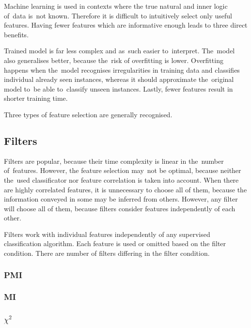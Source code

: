 Machine learning is used in contexts where the true natural and inner logic of~data is~not known. Therefore it is difficult to intuitively select only useful features. Having fewer features which are informative enough leads to three direct benefits.

Trained model is far less complex and as~such easier to~interpret. The~model also generalises better, because the~risk of overfitting is lower. Overfitting happens when the~model recognises irregularities in training data and classifies individual already seen instances, whereas it should approximate the~original model to~be able to~classify unseen instances. Lastly, fewer features result in shorter training time.

Three types of feature selection are generally recognised.



\subsection{Filters}

Filters are popular, because their time complexity is linear in the~number of~features. However, the feature selection may~not be optimal, because neither the~used classificator nor feature correlation is taken into account. When there are highly correlated features, it is unnecessary to choose all of them, because the information conveyed in some may be inferred from others. However, any filter will choose all of them, because filters consider features independently of each other.

Filters work with individual features independently of any supervised classification algorithm. Each feature is used or omitted based on the filter condition. There are number of filters differing in the filter condition.

\subsubsection{PMI}

\subsubsection{MI}

\subsubsection{$\chi^2$}




